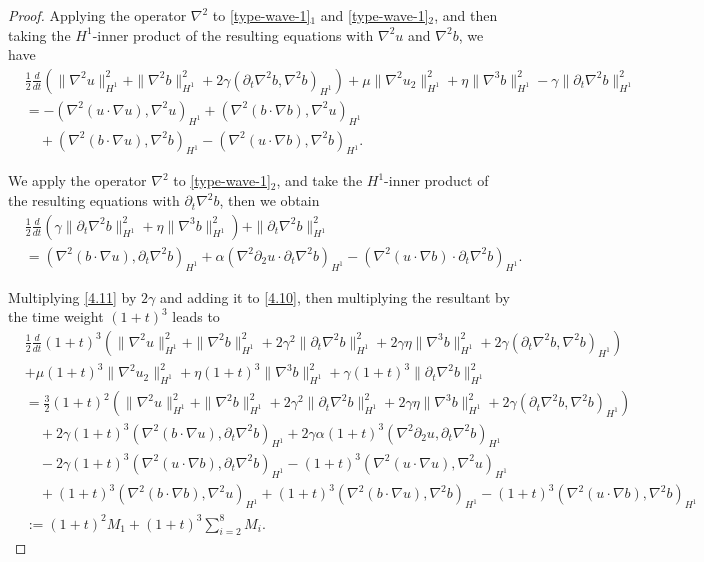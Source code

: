 \documentclass[reqno,11pt]{amsart}
\numberwithin{Thm}{section}
\begin{document}
\begin{proof}
Applying the operator $\nabla^2$ to \eqref{type-wave-1}$_1$ and \eqref{type-wave-1}$_2$, and then taking the $H^1$-inner product of the resulting equations with $\nabla^2 u$ and $\nabla^2 b$, we have
\begin{align}\label{4.10}
&\frac{1}{2}\frac{d}{dt}(\|\nabla^2u\|^2_{H^1}+\|\nabla^2b\|^2_{H^1}+2\gamma(\partial_t\nabla^2b,\nabla^2b)_{H^1})+\mu\|\nabla^{2}u_2\|^2_{H^1}+\eta\|\nabla^{3}b\|^2_{H^1}-\gamma\|\partial_t\nabla^2b\|^2_{H^1}\nonumber\\
&=-\left(\nabla^2(u\cdot\nabla u),\nabla^2u\right)_{H^1}+\left(\nabla^2(b\cdot\nabla b),\nabla^2u\right)_{H^1}\nonumber\\
&\quad+\left(\nabla^2(b\cdot\nabla u),\nabla^2b\right)_{H^1}-\left(\nabla^2(u\cdot\nabla b),\nabla^2b\right)_{H^1}.
\end{align}

 We apply the operator $\nabla^2$ to \eqref{type-wave-1}$_2$, and take the $H^1$-inner product of the resulting equations with $\partial_t\nabla^2b$, then we obtain
\begin{align}\label{4.11}
&\frac{1}{2}\frac{d}{dt}(\gamma\|\partial_t\nabla^2b\|^2_{H^1}+\eta\|\nabla^{3}b\|^2_{H^1})+\|\partial_t\nabla^2b\|^2_{H^1}\nonumber\\
&=(\nabla^2(b\cdot\nabla u),\partial_t\nabla^2 b)_{H^1} +\alpha(\nabla^2\partial_2u\cdot\partial_t\nabla^2b)_{H^1}-(\nabla^2(u\cdot\nabla b)\cdot\partial_t\nabla^2 b)_{H^1}.
\end{align}



Multiplying \eqref{4.11} by $2\gamma$ and adding it to \eqref{4.10}, then multiplying the resultant by the time weight $(1+t)^3$ leads to
\begin{align*}
&\frac{1}{2}\frac{d}{dt}(1+t)^3\left(\|\nabla^2 u\|^2_{H^1}+\|\nabla^2 b\|^2_{H^1}+2\gamma^2\|\partial_t\nabla^2b\|^2_{H^1}
+2\gamma\eta\|\nabla^{3}b\|^2_{H^1}+2\gamma(\partial_t\nabla^2b,\nabla^2b)_{H^1}
\right)\nonumber\\
&+\mu(1+t)^3\|\nabla^{2}u_2\|^2_{H^1}+\eta(1+t)^3\|\nabla^{3}b\|^2_{H^1}+\gamma(1+t)^3\|\partial_t\nabla^2b\|^2_{H^1}\nonumber\\
&=\frac{3}{2}(1+t)^2\left(\|\nabla^2 u\|^2_{H^1}+\|\nabla^2 b\|^2_{H^1}+2\gamma^2\|\partial_t\nabla^2b\|^2_{H^1}
+2\gamma\eta\|\nabla^{3}b\|^2_{H^1}+2\gamma(\partial_t\nabla^2b,\nabla^2b)_{H^1}
\right)\nonumber\\
&\quad+2\gamma(1+t)^3(\nabla^2(b\cdot\nabla u),\partial_t\nabla^2 b)_{H^1} +2\gamma\alpha(1+t)^3(\nabla^2\partial_2u,\partial_t\nabla^2b)_{H^1}\nonumber\\
&\quad-2\gamma(1+t)^3(\nabla^2(u\cdot\nabla b),\partial_t\nabla^2 b)_{H^1}-(1+t)^3(\nabla^2(u\cdot\nabla u),\nabla^2u)_{H^1}\nonumber\\
&\quad+(1+t)^3(\nabla^2(b\cdot\nabla b),\nabla^2u)_{H^1} +(1+t)^3(\nabla^2(b\cdot\nabla u),\nabla^2b)_{H^1}-(1+t)^3(\nabla^2(u\cdot \nabla b),\nabla^2b)_{H^1}\nonumber\\
&:=(1+t)^2M_1+(1+t)^3\sum_{i=2}^8M_i.
\end{align*}




\end{proof}
\end{document}
